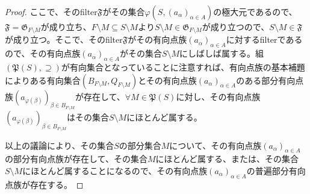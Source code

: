 \documentclass[dvipdfmx]{jsarticle}
\begin{document}
\begin{proof}
ここで、そのfilter$\mathfrak{F}$がその集合$\varphi\left( S,\left( a_{\alpha} \right)_{\alpha \in A} \right)$の極大元であるので、$\mathfrak{F} =\mathfrak{G}_{F \setminus M}$が成り立ち、$F \setminus M \subseteq S \setminus M$より$S \setminus M \in \mathfrak{G}_{F \setminus M}$が成り立つので、$S \setminus M \in \mathfrak{F}$が成り立つ。そこで、そのfilter$\mathfrak{F}$がその有向点族$\left( a_{\alpha} \right)_{\alpha \in A}$に対するfilterであるので、その有向点族$\left( a_{\alpha} \right)_{\alpha \in A}$がその集合$S \setminus M$にしばしば属する。組$\left( \mathfrak{P}(S), \supseteq \right)$が有向集合となっていることに注意すれば、有向点族の基本補題によりある有向集合$\left( B_{F \setminus M},Q_{F \setminus M} \right)$とその有向点族$\left( a_{\alpha} \right)_{\alpha \in A}$のある部分有向点族$\left( a_{\varphi(\beta)} \right)_{\beta \in B_{F \setminus M}}$が存在して、$\forall M \in \mathfrak{P}(S)$に対し、その有向点族$\left( a_{\varphi(\beta)} \right)_{\beta \in B_{F \setminus M}}$はその集合$S \setminus M$にほとんど属する。\par
以上の議論により、その集合$S$の部分集合$M$について、その有向点族$\left( a_{\alpha} \right)_{\alpha \in A}$の部分有向点族が存在して、その集合$M$にほとんど属する、または、その集合$S \setminus M$にほとんど属することになるので、その有向点族$\left( a_{\alpha} \right)_{\alpha \in A}$の普遍部分有向点族が存在する。
\end{proof}
\end{document}
